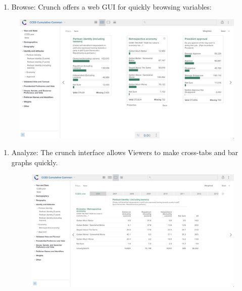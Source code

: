 \documentclass[10pt,article,oneside]{memoir}
\theoremstyle{definition}
\begin{document}
\newpage

\begin{enumerate}
\def\labelenumi{\arabic{enumi}.}
\setcounter{enumi}{1}
\tightlist
\item
  Browse: Crunch offers a web GUI for quickly browsing variables:
\end{enumerate}

\begin{figure}[H]
\centering
\centerline{\includegraphics[width=1.05\linewidth]{01_crunch_browse.png}}
\end{figure}

\begin{enumerate}
\def\labelenumi{\arabic{enumi}.}
\setcounter{enumi}{2}
\tightlist
\item
  Analyze: The crunch interface allows Viewers to make cross-tabs and
  bar graphs quickly.\\

  \begin{figure}[H]
  \centering
  \centerline{\includegraphics[width=1.05\linewidth]{02_crunch_tab.png}}
  \end{figure}
\end{enumerate}
\end{document}
